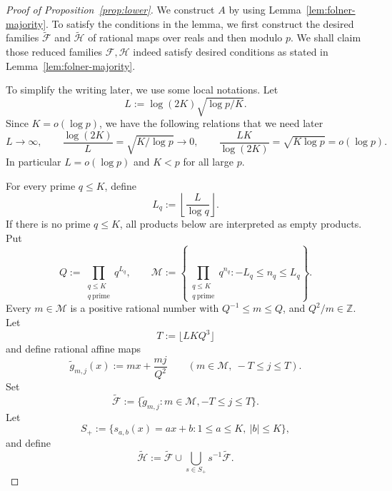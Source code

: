 \documentclass[11pt,letterpaper,reqno]{amsart}
\theoremstyle{definition}
\newcommand{\Z}{\mathbb Z}
\newcommand{\1}{\mathbf 1}
\begin{document}
\begin{proof}[Proof of Proposition~\ref{prop:lower}]
We construct $A$ by using Lemma~\ref{lem:folner-majority}. To satisfy the conditions in the lemma, we first construct the desired families $  \widetilde{\mathcal F}$ and $  \widetilde{\mathcal H}$ of rational maps over reals and then modulo $p$. We shall claim those reduced families $  {\mathcal F}, {\mathcal{H}}$ indeed satisfy desired conditions as stated in Lemma~\ref{lem:folner-majority}.

To simplify the writing later, we use some local notations. 
Let
\[
        L:= \log(2K)\sqrt{\log p/K}.
\]
Since $K=o(\log p)$, we have the following relations that we need later
\begin{equation}\label{eq:L-choice}
        L\to\infty,
        \qquad
        \frac{\log(2K)}{L}=\sqrt{K/\log p}\to0,
        \qquad
        \frac{LK}{\log(2K)}=\sqrt{K\log p}=o(\log p).
\end{equation}
In particular $L=o(\log p)$ and $K<p$ for all large $p$.

For every prime $q\le K$, define
\[
        L_q:=\left\lfloor\frac{L}{\log q}\right\rfloor.
\]
If there is no prime $q\le K$, all products below are interpreted as empty
products.  Put
\[
        Q:=\prod_{\substack{q\le K\\ q\ \mathrm{prime}}}q^{L_q},
        \qquad
        \mathcal M:=\left\{
        \prod_{\substack{q\le K\\ q\ \mathrm{prime}}}q^{n_q}:
        -L_q\le n_q\le L_q
        \right\}.
\]
Every $m\in\mathcal M$ is a positive rational number with $Q^{-1}\le m\le Q$,
and $Q^2/m\in\Z$.  Let
\[
        T:=\lfloor LKQ^3\rfloor
\]
and define rational affine maps
\[
        \widetilde g_{m,j}(x):=mx+\frac{mj}{Q^2}
        \qquad (m\in\mathcal M,\ -T\le j\le T).
\]
Set
\[
        \widetilde{\mathcal F}:=\{\widetilde g_{m,j}:m\in\mathcal M,
        -T\le j\le T\}.
\]
Let
\[
        S_+:=\{s_{a,b}(x)=ax+b:1\le a\le K,
        \ |b|\le K\},
\]
and define
\[
        \widetilde{\mathcal H}:=
        \widetilde{\mathcal F}\cup
        \bigcup_{s\in S_+}s^{-1}\widetilde{\mathcal F}.
\]


\end{proof}
\end{document}

